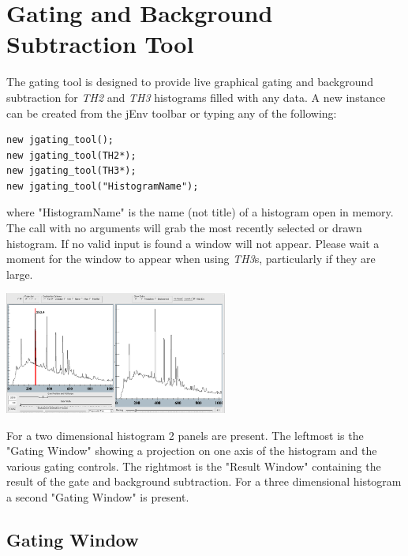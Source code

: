 \documentclass[a4paper,10pt]{article}
\begin{document}
\section{Gating and Background Subtraction Tool}
The gating tool is designed to provide live graphical gating and background subtraction for \textit{TH2} and \textit{TH3} histograms filled with any data. 
A new instance can be created from the jEnv toolbar or typing any of the following:
\lstset{language=C++}
\begin{lstlisting}
new jgating_tool();
new jgating_tool(TH2*);
new jgating_tool(TH3*);
new jgating_tool("HistogramName");
\end{lstlisting}
where "HistogramName" is the name (not title) of a histogram open in memory. The call with no arguments will grab the most recently selected or drawn histogram. If no valid input is found a window will not appear. Please wait a moment for the window to appear when using \textit{TH3}s, particularly if they are large.
\begin{center}
\includegraphics[width=0.55\textwidth]{toolA.png}
\end{center}

For a two dimensional histogram 2 panels are present. The leftmost is the "Gating Window" showing a projection on one axis of the histogram and the various gating controls. The rightmost is the "Result Window" containing the result of the gate and background subtraction.
For a three dimensional histogram a second "Gating Window" is present.

\subsection{Gating Window}
\end{document}
